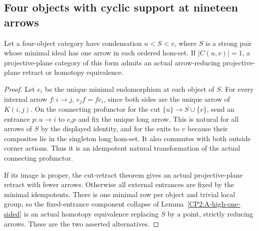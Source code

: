 \subsection{Four objects with cyclic support at nineteen arrows}

\begin{lemma}
\label{CP2:A-singleton-long-minimal-pair-retract}
Let a four-object category have condensation $u<S<v$, where $S$
is a strong pair whose minimal ideal has one arrow in each ordered
hom-set. If $|C(u,v)|=1$, a projective-plane category of this form
admits an actual arrow-reducing projective-plane retract or homotopy
equivalence.
\end{lemma}
\begin{proof}
Let $e_i$ be the unique minimal endomorphism at each object of $S$.
For every internal arrow $f:i\to j$,
$e_jf=fe_i$, since both sides are the unique arrow of $K(i,j)$.
On the connecting profunctor for the cut $\{u\}\to S\cup\{v\}$,
send an entrance $p:u\to i$ to $e_ip$ and fix the unique long
arrow. This is natural for all arrows of $S$ by the displayed
identity, and for the exits to $v$ because their composites lie
in the singleton long hom-set. It also commutes with both outside
corner actions. Thus it is an idempotent natural transformation
of the actual connecting profunctor.

If its image is proper, the cut-retract theorem gives an actual
projective-plane retract with fewer arrows. Otherwise all external
entrances are fixed by the minimal idempotents. There is one minimal
row per object and trivial local group, so the fixed-entrance
component collapse of Lemma~\ref{CP2:A-high-one-sided} is an actual
homotopy equivalence replacing $S$ by a point, strictly reducing
arrows. These are the two asserted alternatives.
\end{proof}

